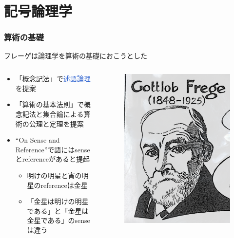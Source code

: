 \documentclass[unicode, 14pt, aspectratio=169]{beamer}
\begin{document}
\section{記号論理学}
\begin{frame}
  \frametitle{算術の基礎}
  {\large フレーゲは論理学を算術の基礎におこうとした}
  \begin{columns}
    \begin{column}{0.8\textwidth}
      \begin{itemize}
      \item 「概念記法」で\textcolor{highlight}{述語論理}を提案
      \item 「算術の基本法則」で概念記法と集合論による算術の公理と定理を提案
      \item ``On Sense and Reference''で語にはsenseとreferenceがあると提起
        \begin{itemize}
        \item 明けの明星と宵の明星のreferenceは金星
        \item 「金星は明けの明星である」と「金星は金星である」のsenseは違う
        \end{itemize}
      \end{itemize}
    \end{column}    
    \begin{column}{0.2\textwidth}
      \begin{figure}
        \includegraphics[width=1\textwidth]{images/frege.png}

\end{figure}
\end{column}
\end{columns}
\end{frame}
\end{document}
